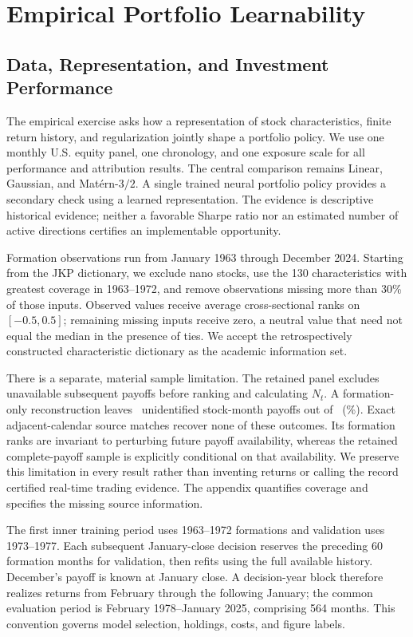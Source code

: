 \section{Empirical Portfolio Learnability}
\label{sec:empirics}

\subsection{Data, Representation, and Investment Performance}

The empirical exercise asks how a representation of stock characteristics,
finite return history, and regularization jointly shape a portfolio policy.
We use one monthly U.S. equity panel, one chronology, and one exposure scale
for all performance and attribution results. The central comparison remains
Linear, Gaussian, and Mat\'ern-$3/2$. A single trained neural portfolio policy
provides a secondary check using a learned representation. The evidence is
descriptive historical evidence; neither a favorable Sharpe ratio nor an
estimated number of active directions certifies an implementable opportunity.

Formation observations run from January 1963 through December 2024. Starting
from the JKP dictionary, we exclude nano stocks, use the 130 characteristics
with greatest coverage in 1963--1972, and remove observations missing more than
30\% of those inputs. Observed values receive average cross-sectional ranks
on $[-0.5,0.5]$; remaining missing inputs receive zero, a neutral value that
need not equal the median in the presence of ties. We accept the retrospectively
constructed characteristic dictionary as the academic information set.

There is a separate, material sample limitation. The retained panel excludes
unavailable subsequent payoffs before ranking and calculating $N_t$. A
formation-only reconstruction leaves \MissingCount\ unidentified stock-month
payoffs out of \FormationCount\ (\MissingShare\%). Exact adjacent-calendar
source matches recover none of these outcomes. Its formation ranks are
invariant to perturbing future payoff availability, whereas the retained
complete-payoff sample is explicitly conditional on that availability. We
preserve this limitation in every result rather than inventing returns or
calling the record certified real-time trading evidence. The appendix
quantifies coverage and specifies the missing source information.

The first inner training period uses 1963--1972 formations and validation
uses 1973--1977. Each subsequent January-close decision reserves the preceding
60 formation months for validation, then refits using the full available
history. December's payoff is known at January close. A decision-year block
therefore realizes returns from February through the following January; the
common evaluation period is February 1978--January 2025, comprising 564 months.
This convention governs model selection, holdings, costs, and figure labels.

